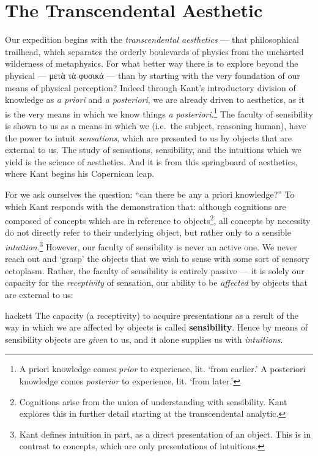 \section{The Transcendental Aesthetic}
Our expedition begins with the \emph{transcendental aesthetics} --- that philosophical trailhead, which separates the orderly boulevards of physics from the uncharted wilderness of metaphysics. For what better way there is to explore beyond the physical --- μετὰ τὰ φυσικά --- than by starting with the very foundation of our means of physical perception? Indeed through Kant's introductory division of knowledge as \emph{a priori} and \emph{a posteriori}, we are already driven to aesthetics, as it is the very means in which we know things \emph{a posteriori}.\footnote{A priori knowledge comes \emph{prior} to experience, lit. \enquote*{from earlier.} A posteriori knowledge comes \emph{posterior} to experience, lit. \enquote*{from later.}} The faculty of sensibility is shown to us as a means in which we (i.e.\ the subject, reasoning human), have the power to intuit \emph{sensations}, which are presented to us by objects that are external to us. The study of sensations, sensibility, and the intuitions which we yield is the science of aesthetics. And it is from this springboard of aesthetics, where Kant begins his Copernican leap.

For we ask ourselves the question: \enquote{can there be any a priori knowledge?} To which Kant responds with the demonstration that: although cognitions are composed of concepts which are in reference to objects\footnote{Cognitions arise from the union of understanding with sensibility. Kant explores this in further detail starting at the transcendental analytic.}, all concepts by necessity do not directly refer to their underlying object, but rather only to a sensible \emph{intuition}.\footnote{Kant defines intuition in part, as a direct presentation of an object. This is in contrast to concepts, which are only presentations of intuitions.} However, our faculty of sensibility is never an active one. We never reach out and \enquote*{grasp} the objects that we wish to sense with some sort of sensory ectoplasm. Rather, the faculty of sensibility is entirely passive --- it is solely our capacity for the \emph{receptivity} of sensation, our ability to be \emph{affected} by objects that are external to us:


\begin{displaycquote}[B33]{hackett}
  The capacity (a receptivity) to acquire presentations as a result of the way in which we are affected by objects is called \textbf{sensibility}. Hence by means of sensibility objects are \emph{given} to us, and it alone supplies us with \emph{intuitions}.
\end{displaycquote}


